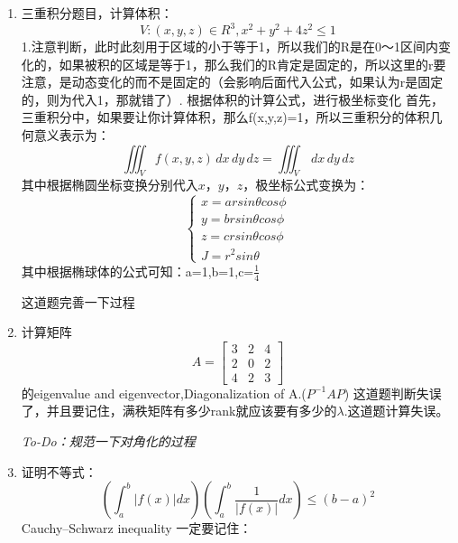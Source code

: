 \documentclass{ctexart}
\newcommand{\cbox}[2][yellow]{%
  \colorbox{#1}{\parbox{\dimexpr\linewidth-2\fboxsep}{\strut #2\strut}}%
}
\begin{document}
\begin{enumerate}
    \item
    三重积分题目，计算体积：
    \[ V:{(x,y,z)\in R^3, x^2+y^2+4z^2 \leq 1} \]
    1.注意判断，此时此刻用于区域的小于等于1，所以我们的R是在0～1区间内变化的，如果被积的区域是等于1，那么我们的R肯定是固定的，所以这里的r要注意，是动态变化的而不是固定的（会影响后面代入公式，如果认为r是固定的，则为代入1，那就错了）. 根据体积的计算公式，进行极坐标变化
    \newline 首先，三重积分中，如果要让你计算体积，那么f(x,y,z)=1，所以三重积分的体积几何意义表示为：
    \[\iiint_V f(x,y,z) \,dx\,dy\,dz = \iiint_V \,dx\,dy\,dz  \] 
    其中根据椭圆坐标变换分别代入$x$，$y$，$z$，极坐标公式变换为：
    \[
    \left\{
    \begin{aligned}
    x=arsin \theta cos\phi \\
    y=brsin \theta cos\phi \\
    z=crsin \theta cos\phi \\
    J=r^2sin \theta
    \end{aligned}
    \right.
    \]
其中根据椭球体的公式可知：a=1,b=1,c=$\frac{1}{4}$\newline
   
\cbox[gray!30]{这道题完善一下过程}

    \item 
    计算矩阵
    \[ A=
    \begin{bmatrix}
    3 & 2 & 4 \\
    2 & 0 & 2 \\
    4 & 2 & 3
    \end{bmatrix}
    \] 的eigenvalue and eigenvector,Diagonalization of A.($P^{-1}AP$)
    这道题判断失误了，并且要记住，满秩矩阵有多少rank就应该要有多少的$\lambda$.这道题计算失误。
    \cbox[gray!30]{\textsl{To-Do：规范一下对角化的过程}}
    
    \item 
    证明不等式：\[
    (\int_{a}^{b} |f(x)|dx)(\int_{a}^{b}\frac{1}{|f(x)|}dx) \leq (b-a)^2
    \]
    Cauchy–Schwarz inequality 一定要记住：
    
    
\end{enumerate}
\end{document}
